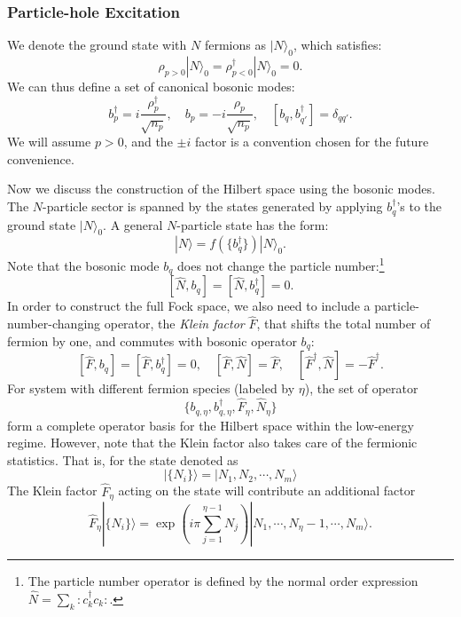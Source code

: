 \subsubsection*{Particle-hole Excitation}
We denote the ground state with $N$ fermions as $|N\rangle_0$, which satisfies:
\begin{equation}
	\rho_{p>0}|N\rangle_0 = \rho^\dagger_{p<0}|N\rangle_0 = 0.
\end{equation}
We can thus define a set of canonical bosonic modes:
\begin{equation}
	b_p^\dagger = i\frac{\rho^\dagger_p}{\sqrt{n_p}}, \quad 
	b_p = -i\frac{\rho_p}{\sqrt{n_p}}, \quad [b_q,b_{q'}^\dagger] = \delta_{qq'}.
\end{equation}
We will assume $p>0$, and the $\pm i$ factor is a convention chosen for the future convenience.

Now we discuss the construction of the Hilbert space using the bosonic modes.
The $N$-particle sector is spanned by the states generated by applying $b_q^\dagger$'s to the ground state $|N\rangle_0$.
A general $N$-particle state has the form:
\begin{equation}
	|N\rangle = f(\{b_q^\dagger\})|N\rangle_0.
\end{equation}
Note that the bosonic mode $b_q$ does not change the particle number:\footnote{The particle number operator is defined by the normal order expression $\hat{N} = \sum_k {:\mathrel{c_{k}^\dagger c_{k}}:}$.}
\begin{equation}
	\left[\hat N, b_q \right] = \left[\hat N, b_q^\dagger \right] = 0.
\end{equation}
In order to construct the full Fock space, we also need to include a particle-number-changing operator, the \textit{Klein factor} $\hat F$, that shifts the total number of fermion by one, and commutes with bosonic operator $b_q$:
\begin{equation}
	\left[\hat F, b_q \right] = \left[\hat F, b_q^\dagger \right] = 0, \quad
	\left[\hat F, \hat N \right] = \hat F, \quad 
	\left[\hat F^\dagger, \hat N \right] = -\hat F^\dagger.
\end{equation}
For system with different fermion species (labeled by $\eta$), the set of operator
\begin{equation*}
	\{b_{q,\eta}, b_{q,\eta}^\dagger, \hat F_\eta, \hat N_\eta\}
\end{equation*}
form a complete operator basis for the Hilbert space within the low-energy regime.
However, note that the Klein factor also takes care of the fermionic statistics. 
That is, for the state denoted as
\begin{equation}
	|\{N_i\}\rangle = |N_1,N_2,\cdots,N_m\rangle
\end{equation}
The Klein factor $\hat F_\eta$ acting on the state will contribute an additional factor
\begin{equation}
	\hat F_\eta|\{N_i\}\rangle = \exp\left(i\pi\sum_{j=1}^{\eta-1}N_j\right)|N_1,\cdots,N_\eta-1,\cdots,N_m\rangle.
\end{equation}



